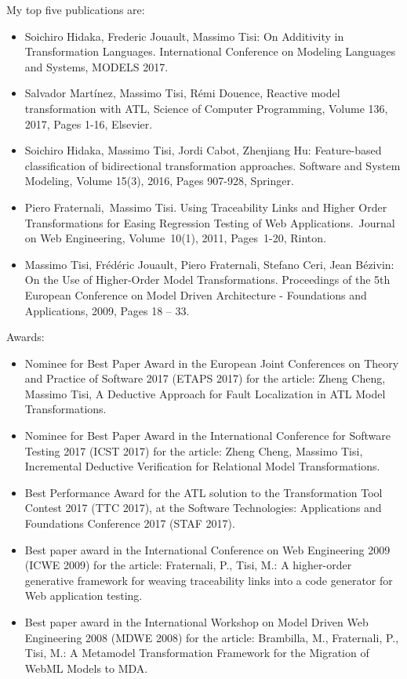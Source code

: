 \medskip
My top five publications are:
\begin{itemize}
\item Soichiro Hidaka, Frederic Jouault, Massimo Tisi: On Additivity in Transformation Languages. International Conference on Modeling Languages and Systems, MODELS 2017.
\item Salvador Martínez, Massimo Tisi, Rémi Douence, Reactive model transformation with ATL, Science of Computer Programming, Volume 136, 2017, Pages 1-16, Elsevier.
\item Soichiro Hidaka, Massimo Tisi, Jordi Cabot, Zhenjiang Hu: Feature-based classification of bidirectional transformation approaches. Software and System Modeling, Volume 15(3), 2016, Pages 907-928, Springer.
\item Piero Fraternali, Massimo Tisi. Using Traceability Links and Higher Order Transformations for Easing Regression Testing of Web Applications. Journal on Web Engineering, Volume 10(1), 2011, Pages 1-20, Rinton.
\item Massimo Tisi, Frédéric Jouault, Piero Fraternali, Stefano Ceri, Jean Bézivin: On the Use of Higher-Order Model Transformations. Proceedings of the 5th European Conference on Model Driven Architecture - Foundations and Applications, 2009, Pages 18 – 33.
\end{itemize}

\medskip
Awards: 
\begin{itemize}
\item Nominee for Best Paper Award in the European Joint Conferences on Theory and Practice of Software 2017 (ETAPS 2017) for the article: Zheng Cheng, Massimo Tisi, A Deductive Approach for Fault Localization in ATL Model Transformations.
\item Nominee for Best Paper Award in the International Conference for Software Testing 2017 (ICST 2017) for the article: Zheng Cheng, Massimo Tisi, Incremental Deductive Verification for Relational Model Transformations.
\item Best Performance Award for the ATL solution to the Transformation Tool Contest 2017 (TTC 2017), at the Software Technologies: Applications and Foundations Conference 2017 (STAF 2017).
\item Best paper award in the International Conference on Web Engineering 2009 (ICWE 2009) for the article: Fraternali, P., Tisi, M.: A higher-order generative framework for weaving traceability links into a code generator for Web application testing.
\item Best paper award in the International Workshop on Model Driven Web Engineering 2008 (MDWE 2008) for the article: Brambilla, M., Fraternali, P., Tisi, M.: A Metamodel Transformation Framework for the Migration of WebML Models to MDA.
\end{itemize}

